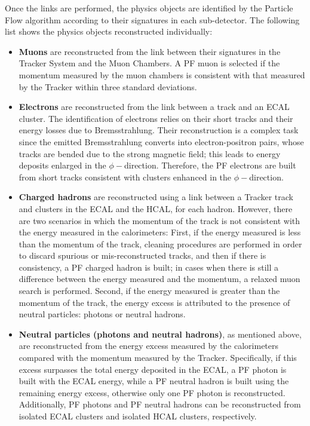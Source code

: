 \noindent Once the links are performed, the physics objects are identified by 
the Particle Flow algorithm according to their signatures in each sub-detector. The following
list shows the physics objects reconstructed individually:
\begin{itemize}
 \item \textbf{Muons} are reconstructed from the link between their signatures in the 
 Tracker System and the Muon Chambers. A PF muon is selected if the momentum measured 
 by the muon chambers is consistent with that measured by the Tracker within three standard deviations.
 \item \textbf{Electrons} are reconstructed from the link between a track and an ECAL cluster. The
 identification of electrons relies on their short tracks and their energy losses 
 due to  Bremsstrahlung. Their reconstruction is a complex task since the emitted Bremsstrahlung converts 
 into electron-positron pairs, whose tracks are bended due to the strong magnetic field; this leads to 
 energy deposits enlarged in the $\phi-$direction. Therefore, the PF electrons are built 
 from short tracks consistent with clusters enhanced in the $\phi-$direction.
 \item \textbf{Charged hadrons} are reconstructed using a link between a Tracker track and 
 clusters in the ECAL and the HCAL, for each hadron. However, there are 
 two scenarios in which the momentum of the track is not consistent with the energy measured 
 in the calorimeters: First, if the energy measured is less than the momentum 
 of the track, cleaning procedures are performed in order to discard spurious or mis-reconstructed 
 tracks, and then if there is consistency, a PF charged hadron is built; in cases 
 when there is still a difference between the energy measured and the momentum, a relaxed muon 
 search is performed. Second, if the energy measured is greater than
 the momentum of the track, the energy excess is attributed to the presence 
 of neutral particles: photons or neutral hadrons.
 \item \textbf{Neutral particles (photons and neutral hadrons)}, as mentioned above, are reconstructed 
 from the energy excess measured by the calorimeters compared with the momentum measured by the Tracker. Specifically, if
 this excess surpasses the total energy deposited in the ECAL, a PF photon is built with 
 the ECAL energy, while a PF neutral hadron is built using the remaining energy excess, otherwise
 only one PF photon is reconstructed. Additionally, PF photons and PF neutral hadrons can be 
 reconstructed from isolated ECAL clusters and isolated HCAL clusters, respectively.
\end{itemize}

